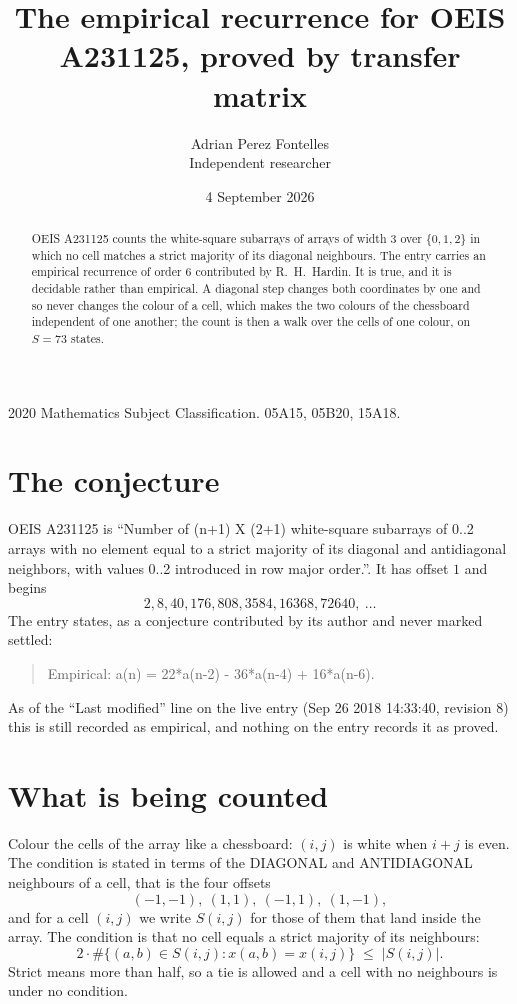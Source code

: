 \documentclass[11pt,a4paper]{article}
\title{The empirical recurrence for OEIS A231125, proved by transfer matrix}
\author{Adrian Perez Fontelles\\ \small Independent researcher}
\date{4 September 2026}
\theoremstyle{plain}
\theoremstyle{definition}
\begin{document}
\maketitle

\begin{abstract}
OEIS A231125 counts the white-square subarrays of arrays of width $3$ over $\{0,1,2\}$ in which
no cell matches a strict majority of its diagonal neighbours. The entry carries an empirical recurrence of order $6$ contributed by
R.~H.~Hardin. It is true, and it is decidable rather than empirical. A diagonal step changes
both coordinates by one and so never changes the colour of a cell, which makes the two colours
of the chessboard independent of one another; the count is then a walk over the cells of one
colour, on $S=73$ states.
\end{abstract}

\noindent\small 2020 Mathematics Subject Classification. 05A15, 05B20, 15A18.\normalsize

\section{The conjecture}

OEIS A231125 is ``Number of (n+1) X (2+1) white-square subarrays of 0..2 arrays with no element equal to a strict majority of its diagonal and antidiagonal neighbors, with values 0..2 introduced in row major order.''. It has offset $1$ and begins
\[
2, 8, 40, 176, 808, 3584, 16368, 72640,\ \dots
\]
The entry states, as a conjecture contributed by its author and never marked settled:
\begin{quote}
Empirical: a(n) = 22*a(n-2) - 36*a(n-4) + 16*a(n-6).
\end{quote}
As of the ``Last modified'' line on the live entry (Sep 26 2018 14:33:40, revision 8) this is still
recorded as empirical, and nothing on the entry records it as proved.

\section{What is being counted}

Colour the cells of the array like a chessboard: $(i,j)$ is white when $i+j$ is even. The
condition is stated in terms of the DIAGONAL and ANTIDIAGONAL neighbours of a cell, that is the
four offsets
\[
(-1,-1),\ (1,1),\ (-1,1),\ (1,-1),
\]
and for a cell $(i,j)$ we write $S(i,j)$ for those of them that land inside the array. The
condition is that no cell equals a strict majority of its neighbours:
\[
2\cdot\#\{(a,b)\in S(i,j) : x(a,b)=x(i,j)\}\;\le\;|S(i,j)| .
\]
Strict means more than half, so a tie is allowed and a cell with no neighbours is under no condition.
\end{document}

